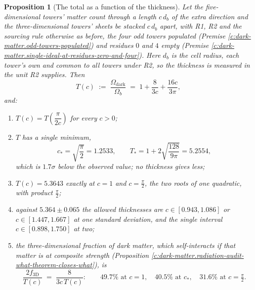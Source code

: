 \documentclass[11pt]{article}
\newtheorem{proposition}[theorem]{Proposition}
\theoremstyle{definition}
\theoremstyle{plain}
\newcommand{\changedmark}[2]{\marginpar{\raggedright\scriptsize\color{#1}#2}}
\begin{document}
\begin{proposition}[The total as a function of the thickness]\label{c:dark-matter.total-function-thickness}
\changedmark{BurntOrange}{changed since the deposit}
Let the five-dimensional towers' matter count through a length $c\,d_{b}$ of the extra direction and the three-dimensional towers' sheets be stacked $c\,d_{b}$ apart, with R1, R2 and the sourcing rule otherwise as before, the four odd towers populated (Premise \ref{c:dark-matter.odd-towers-populated}) and residues $0$ and $4$ empty (Premise \ref{c:dark-matter.single-ideal-at-residues-zero-and-four}). Here $d_{b}$ is the cell radius, each tower's own and common to all towers under R2, so the thickness is measured in the unit R2 supplies. Then
\[
T(c) \;:=\; \frac{\Omega_{\mathrm{dark}}}{\Omega_{b}} \;=\; 1 + \frac{8}{3c} + \frac{16c}{3\pi},
\]
and:
\begin{enumerate}
\item[(i)] $T(c) = T\!\left(\dfrac{\pi}{2c}\right)$ for every $c > 0$;
\item[(ii)] $T$ has a single minimum,
\[
c_{\ast} = \sqrt{\frac{\pi}{2}} = 1.2533, \qquad T_{\ast} = 1 + 2\sqrt{\frac{128}{9\pi}} = 5.2554,
\]
which is $1.7\sigma$ below the observed value; no thickness gives less;
\item[(iii)] $T(c) = 5.3643$ exactly at $c = 1$ and $c = \tfrac{\pi}{2}$, the two roots of one quadratic, with product $\tfrac{\pi}{2}$;
\item[(iv)] against $5.364 \pm 0.065$ the allowed thicknesses are $c \in [0.943, 1.086]$ or $c \in [1.447, 1.667]$ at one standard deviation, and the single interval $c \in [0.898, 1.750]$ at two;
\item[(v)] the three-dimensional fraction of dark matter, which self-interacts if that matter is at composite strength (Proposition \ref{c:dark-matter.radiation-audit-what-theorem-closes-what}), is
\[
\frac{2 f_{3\mathrm{D}}}{T(c)} \;=\; \frac{8}{3c\,T(c)} : \qquad 49.7\% \text{ at } c = 1, \quad 40.5\% \text{ at } c_{\ast}, \quad 31.6\% \text{ at } c = \tfrac{\pi}{2}.
\]
\end{enumerate}
\end{proposition}
\end{document}
